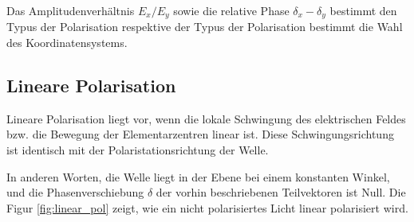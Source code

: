 Das  Amplitudenverh\"altnis  $E_x/E_y$  sowie  die  relative  Phase $\delta_x  -
\delta_y$  bestimmt   den  Typus  der  Polarisation  respektive  der  Typus  der
Polarisation bestimmt die Wahl des Koordinatensystems.


\subsection{Lineare Polarisation}

Lineare  Polarisation  liegt  vor,  wenn die lokale Schwingung des  elektrischen
Feldes   bzw.   die    Bewegung   der   Elementarzentren   linear   ist.   Diese
Schwingungsrichtung  ist identisch mit  der  Polaristationsrichtung  der  Welle.

In anderen Worten, die Welle liegt in der Ebene bei einem konstanten Winkel, und
die  Phasenverschiebung $\delta$ der vorhin beschriebenen Teilvektoren ist Null.
Die Figur \ref{fig:linear_pol} zeigt, wie ein nicht  polarisiertes  Licht linear
polarisiert wird.


